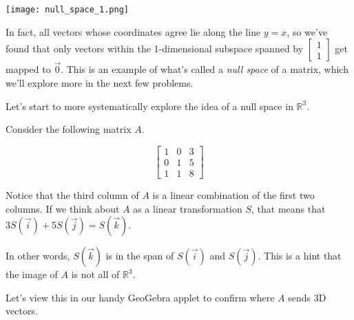 \documentclass{ximera}
\begin{document}
\begin{exploration}
\begin{solution}
        \begin{center}
            \texttt{[image: null\_space\_1.png]}
        \end{center}
    
        In fact, all vectors whose coordinates agree lie along the line $y=x$, so we've found that only vectors within the 1-dimensional subspace spanned by $\begin{bmatrix} 1 \\ 1 \end{bmatrix}$ get mapped to $\vec{0}$. This is an example of what's called a \emph{null space} of a matrix, which we'll explore more in the next few problems.

    \end{solution}

\end{exploration}

Let's start to more systematically explore the idea of a null space in $\mathbb{R}^3$.

Consider the following matrix $A$. 

$$ 
\left[
\begin{matrix}
    1 & 0 & 3  \\
    0 & 1 & 5  \\
    1 & 1 & 8 
\end{matrix}
\right] 
$$

\begin{remark}

    Notice that the third column of $A$ is a linear combination of the first two columns. If we think about $A$ as a linear transformation $S$, that means that $3S(\vec{i})+5S(\vec{j})=S(\vec{k})$. 
    
    In other words, $S(\vec{k})$ is in the span of $S(\vec{i})$ and $S(\vec{j})$. This is a hint that the image of $A$ is not all of $\mathbb{R}^3$.

    Let's view this in our handy GeoGebra applet to confirm where $A$ sends 3D vectors.


\end{remark}
\end{document}
